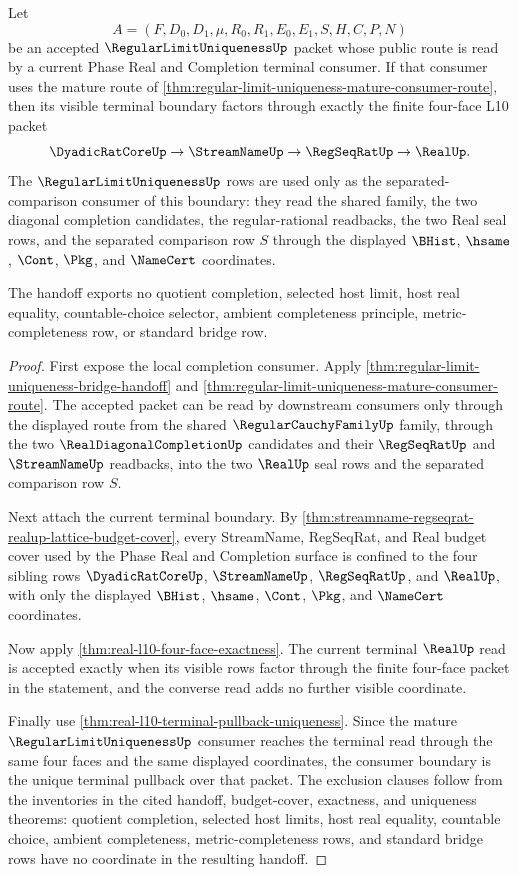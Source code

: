 \begin{theorem}
\label{thm:regular-limit-uniqueness-l10-terminal-handoff}
Let
$$
A=(F,D_0,D_1,\mu,R_0,R_1,E_0,E_1,S,H,C,P,N)
$$
be an accepted $\RegularLimitUniquenessUp$ packet whose public route is read by a current Phase Real and Completion terminal consumer. If that consumer uses the mature route of \autoref{thm:regular-limit-uniqueness-mature-consumer-route}, then its visible terminal boundary factors through exactly the finite four-face L10 packet
$$
\DyadicRatCoreUp \to \StreamNameUp \to \RegSeqRatUp \to \RealUp.
$$
The $\RegularLimitUniquenessUp$ rows are used only as the separated-comparison consumer of this boundary: they read the shared family, the two diagonal completion candidates, the regular-rational readbacks, the two Real seal rows, and the separated comparison row $S$ through the displayed $\BHist$, $\hsame$, $\Cont$, $\Pkg$, and $\NameCert$ coordinates.

The handoff exports no quotient completion, selected host limit, host real equality, countable-choice selector, ambient completeness principle, metric-completeness row, or standard bridge row.
\end{theorem}
\begin{proof}
First expose the local completion consumer. Apply \autoref{thm:regular-limit-uniqueness-bridge-handoff} and \autoref{thm:regular-limit-uniqueness-mature-consumer-route}. The accepted packet can be read by downstream consumers only through the displayed route from the shared $\RegularCauchyFamilyUp$ family, through the two $\RealDiagonalCompletionUp$ candidates and their $\RegSeqRatUp$ and $\StreamNameUp$ readbacks, into the two $\RealUp$ seal rows and the separated comparison row $S$.

Next attach the current terminal boundary. By \autoref{thm:streamname-regseqrat-realup-lattice-budget-cover}, every StreamName, RegSeqRat, and Real budget cover used by the Phase Real and Completion surface is confined to the four sibling rows $\DyadicRatCoreUp$, $\StreamNameUp$, $\RegSeqRatUp$, and $\RealUp$, with only the displayed $\BHist$, $\hsame$, $\Cont$, $\Pkg$, and $\NameCert$ coordinates.

Now apply \autoref{thm:real-l10-four-face-exactness}. The current terminal $\RealUp$ read is accepted exactly when its visible rows factor through the finite four-face packet in the statement, and the converse read adds no further visible coordinate.

Finally use \autoref{thm:real-l10-terminal-pullback-uniqueness}. Since the mature $\RegularLimitUniquenessUp$ consumer reaches the terminal read through the same four faces and the same displayed coordinates, the consumer boundary is the unique terminal pullback over that packet. The exclusion clauses follow from the inventories in the cited handoff, budget-cover, exactness, and uniqueness theorems: quotient completion, selected host limits, host real equality, countable choice, ambient completeness, metric-completeness rows, and standard bridge rows have no coordinate in the resulting handoff.
\end{proof}

